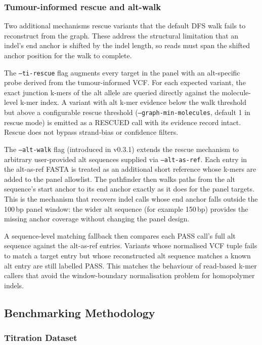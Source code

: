 \subsubsection{Tumour-informed rescue and alt-walk}
\label{sec:method:ti-rescue-alt-walk}

Two additional mechanisms rescue variants that the default DFS walk fails to reconstruct from the graph. These address the structural limitation that an indel's end anchor is shifted by the indel length, so reads must span the shifted anchor position for the walk to complete.

The \texttt{--ti-rescue} flag augments every target in the panel with an alt-specific probe derived from the tumour-informed VCF. For each expected variant, the exact junction k-mers of the alt allele are queried directly against the molecule-level k-mer index. A variant with alt k-mer evidence below the walk threshold but above a configurable rescue threshold (\texttt{--graph-min-molecules}, default 1 in rescue mode) is emitted as a RESCUED call with its evidence record intact. Rescue does not bypass strand-bias or confidence filters.

The \texttt{--alt-walk} flag (introduced in v0.3.1) extends the rescue mechanism to arbitrary user-provided alt sequences supplied via \texttt{--alt-as-ref}. Each entry in the alt-as-ref FASTA is treated as an additional short reference whose k-mers are added to the panel allowlist. The pathfinder then walks paths from the alt sequence's start anchor to its end anchor exactly as it does for the panel targets. This is the mechanism that recovers indel calls whose end anchor falls outside the 100\,bp panel window: the wider alt sequence (for example 150\,bp) provides the missing anchor coverage without changing the panel design.

A sequence-level matching fallback then compares each PASS call's full alt sequence against the alt-as-ref entries. Variants whose normalised VCF tuple fails to match a target entry but whose reconstructed alt sequence matches a known alt entry are still labelled PASS. This matches the behaviour of read-based k-mer callers that avoid the window-boundary normalisation problem for homopolymer indels.

\subsection{Benchmarking Methodology}
\label{sec:method:benchmarking}

\subsubsection{Titration Dataset}

